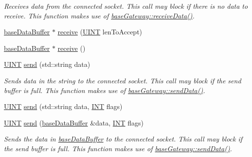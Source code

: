 \begin{DoxyCompactItemize}
\begin{DoxyCompactList}\small\item\em Receives data from the connected socket. This call may block if there is no data to receive. This function makes use of \hyperlink{class_communication_1_1base_gateway_adcdbbefcddb590bf3d2d7b616a915d24}{base\+Gateway\+::receive\+Data()}. \end{DoxyCompactList}\item 
\hyperlink{class_communication_1_1base_data_buffer}{base\+Data\+Buffer} $\ast$ \hyperlink{class_communication_1_1_client_a2e3aedb9540e48b89ad34d9831e5868e}{receive} (\hyperlink{typedefs_8h_a2e2c38961834f28c06e17e074eb00bc7}{U\+I\+N\+T} len\+To\+Accept)
\item 
\hyperlink{class_communication_1_1base_data_buffer}{base\+Data\+Buffer} $\ast$ \hyperlink{class_communication_1_1_client_a333fae358f61a607582a3dc1e849ccd4}{receive} ()
\item 
\hyperlink{typedefs_8h_a2e2c38961834f28c06e17e074eb00bc7}{U\+I\+N\+T} \hyperlink{class_communication_1_1_client_a9f646713fab7ee53a86cc4391c65ba96}{send} (std\+::string data)
\begin{DoxyCompactList}\small\item\em Sends data in the string to the connected socket. This call may block if the send buffer is full. This function makes use of \hyperlink{class_communication_1_1base_gateway_a7f5d58eaadea6e124f065f263f2b8029}{base\+Gateway\+::send\+Data()}. \end{DoxyCompactList}\item 
\hyperlink{typedefs_8h_a2e2c38961834f28c06e17e074eb00bc7}{U\+I\+N\+T} \hyperlink{class_communication_1_1_client_a38725c4bb7fcb0275d7782b1c5a9d44f}{send} (std\+::string data, \hyperlink{typedefs_8h_a0240b856f74f8905ed334a5a0ca624e5}{I\+N\+T} flags)
\item 
\hyperlink{typedefs_8h_a2e2c38961834f28c06e17e074eb00bc7}{U\+I\+N\+T} \hyperlink{class_communication_1_1_client_a3be85163c108c2f8297680689905006c}{send} (\hyperlink{class_communication_1_1base_data_buffer}{base\+Data\+Buffer} \&data, \hyperlink{typedefs_8h_a0240b856f74f8905ed334a5a0ca624e5}{I\+N\+T} flags)
\begin{DoxyCompactList}\small\item\em Sends the data in \hyperlink{class_communication_1_1base_data_buffer}{base\+Data\+Buffer} to the connected socket. This call may block if the send buffer is full. This function makes use of \hyperlink{class_communication_1_1base_gateway_a7f5d58eaadea6e124f065f263f2b8029}{base\+Gateway\+::send\+Data()}. \end{DoxyCompactList}\item 

\end{DoxyCompactItemize}

